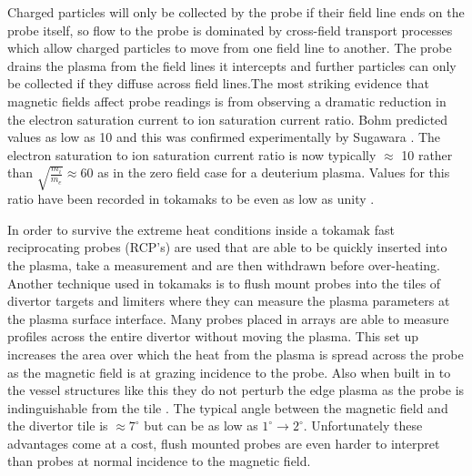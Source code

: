 \documentclass[12pt]{article}
\begin{document}
Charged particles will only be collected by the probe if their field line ends on the probe itself, so flow to the probe is dominated by cross-field transport processes which allow charged particles to move from one field line to another. The probe drains the plasma from the field lines it intercepts and further particles can only be collected if they diffuse across field lines.The most striking evidence that magnetic fields affect probe readings is from observing a dramatic reduction in the electron saturation current to ion saturation current ratio. Bohm predicted values as low as 10 \cite{discharges} and this was confirmed experimentally by Sugawara \cite{monk}. The electron saturation to ion saturation current ratio is now  typically $\approx$ 10 rather than $\sqrt{\frac{m_i}{m_e}} \approx 60$ as in the zero field case for a deuterium plasma.  Values for this ratio have been recorded in tokamaks to be even as low as unity \cite{matthews}. 

In order to survive the extreme heat conditions inside a tokamak fast reciprocating probes (RCP's) are used that are able to be quickly inserted into the plasma, take a measurement and are then withdrawn before over-heating. Another technique used in tokamaks is to flush mount probes into the tiles of divertor targets and limiters where they can measure the plasma parameters at the plasma surface interface. Many probes placed in arrays are able to measure profiles across the entire divertor without moving the plasma.  This set up increases the area over which the heat from the plasma is spread across the probe as the magnetic field is at grazing incidence to the probe. Also when built in to the vessel structures like this they do not perturb the edge plasma as the probe is indinguishable from the tile \cite{stangeby-2000}. The typical angle between the magnetic field and the divertor tile is $\approx 7 ^{\circ}$ but can be as low as $1^{\circ} \to 2^{\circ}$.  Unfortunately these advantages come at a cost, flush mounted probes are even harder to interpret than probes at normal incidence to the magnetic field. 
 
\end{document}
